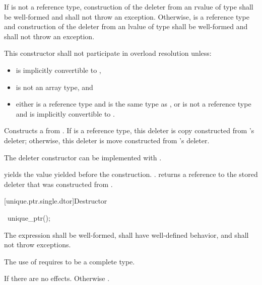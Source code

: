 \begin{itemdescr}
\pnum
\requires If  is not a reference type,
construction of the deleter from an rvalue of type
 shall be well-formed and shall not throw an exception.
Otherwise,  is a reference type and construction of the deleter from an
lvalue of type  shall be well-formed and shall not throw an exception.

\pnum
\remarks
This constructor shall not participate in overload resolution unless:
\begin{itemize}
\item {} is implicitly convertible to ,
\item {} is not an array type, and
\item either  is a reference type and  is the same type as , or
 is not a reference type and  is implicitly convertible to .
\end{itemize}

\pnum
\effects
Constructs a  from .
If  is a reference type, this deleter is copy constructed from
's deleter; otherwise, this deleter is move constructed from 's
deleter.
\begin{note}
The deleter constructor can be implemented with
.
\end{note}

\pnum
\ensures
{} yields the value 
yielded before the construction. .
 returns a reference
to the stored deleter that was constructed from
.
\end{itemdescr}

[unique.ptr.single.dtor]{Destructor}

%
\begin{itemdecl}
~unique_ptr();
\end{itemdecl}

\begin{itemdescr}
\pnum
\requires The expression  shall be well-formed,
shall have well-defined behavior, and shall not throw exceptions.
\begin{note}
The
use of  requires  to be a complete type.
\end{note}

\pnum
\effects
If  there are no effects.
Otherwise .
\end{itemdescr}

